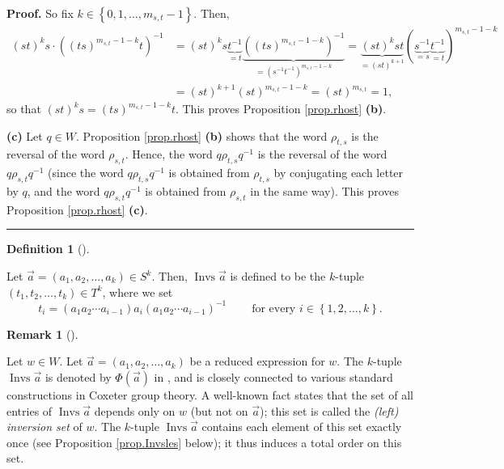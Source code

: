 \documentclass[numbers=enddot,12pt,final,onecolumn,notitlepage,abstracton]{scrartcl}%
\theoremstyle{definition}
\newtheorem{defi}[theo]{Definition}
\newenvironment{definition}[1][]
{\begin{defi}[#1]\begin{leftbar}}
{\end{leftbar}\end{defi}}
\newtheorem{remk}[theo]{Remark}
\newenvironment{remark}[1][]
{\begin{remk}[#1]\begin{leftbar}}
{\end{leftbar}\end{remk}}
\newenvironment{proof}[1][Proof]{\noindent\textbf{#1.} }{\ \rule{0.5em}{0.5em}}
\begin{document}
\begin{proof}
So fix $k\in\left\{  0,1,\ldots,m_{s,t}-1\right\}  $. Then,%
\begin{align*}
\left(  st\right)  ^{k}s\cdot\left(  \left(  ts\right)  ^{m_{s,t}%
-1-k}t\right)  ^{-1}  &  =\left(  st\right)  ^{k}s\underbrace{t^{-1}}%
_{=t}\underbrace{\left(  \left(  ts\right)  ^{m_{s,t}-1-k}\right)  ^{-1}%
}_{=\left(  s^{-1}t^{-1}\right)  ^{m_{s,t}-1-k}}=\underbrace{\left(
st\right)  ^{k}st}_{=\left(  st\right)  ^{k+1}}\left(  \underbrace{s^{-1}%
}_{=s}\underbrace{t^{-1}}_{=t}\right)  ^{m_{s,t}-1-k}\\
&  =\left(  st\right)  ^{k+1}\left(  st\right)  ^{m_{s,t}-1-k}=\left(
st\right)  ^{m_{s,t}}=1,
\end{align*}
so that $\left(  st\right)  ^{k}s=\left(  ts\right)  ^{m_{s,t}-1-k}t$. This
proves Proposition \ref{prop.rhost} \textbf{(b)}. \medskip

\textbf{(c)} Let $q\in W$. Proposition \ref{prop.rhost} \textbf{(b)} shows
that the word $\rho_{t,s}$ is the reversal of the word $\rho_{s,t}$. Hence,
the word $q\rho_{t,s}q^{-1}$ is the reversal of the word $q\rho_{s,t}q^{-1}$
(since the word $q\rho_{t,s}q^{-1}$ is obtained from $\rho_{t,s}$ by
conjugating each letter by $q$, and the word $q\rho_{s,t}q^{-1}$ is obtained
from $\rho_{s,t}$ in the same way). This proves Proposition \ref{prop.rhost}
\textbf{(c)}.
\end{proof}

\begin{definition}
\label{def.Invsle}Let $\overrightarrow{a}=\left(  a_{1},a_{2},\ldots
,a_{k}\right)  \in S^{k}$. Then, $\operatorname*{Invs}\overrightarrow{a}$ is
defined to be the $k$-tuple $\left(  t_{1},t_{2},\ldots,t_{k}\right)  \in
T^{k}$, where we set%
\[
t_{i}=\left(  a_{1}a_{2}\cdots a_{i-1}\right)  a_{i}\left(  a_{1}a_{2}\cdots
a_{i-1}\right)  ^{-1}\ \ \ \ \ \ \ \ \ \ \text{for every }i\in\left\{
1,2,\ldots,k\right\}  .
\]

\end{definition}

\begin{remark}
Let $w\in W$. Let $\overrightarrow{a}=\left(  a_{1},a_{2},\ldots,a_{k}\right)
$ be a reduced expression for $w$. The $k$-tuple $\operatorname*{Invs}%
\overrightarrow{a}$ is denoted by $\Phi\left(  \overrightarrow{a}\right)  $ in
\cite[Chapter 4, n$^{\circ}$ 1.4]{Bourbaki4-6}, and is closely connected to
various standard constructions in Coxeter group theory. A well-known fact
states that the set of all entries of $\operatorname*{Invs}\overrightarrow{a}$
depends only on $w$ (but not on $\overrightarrow{a}$); this set is called the
\emph{(left) inversion set} of $w$. The $k$-tuple $\operatorname*{Invs}%
\overrightarrow{a}$ contains each element of this set exactly once (see
Proposition \ref{prop.Invsles} below); it thus induces a total order on this set.
\end{remark}
\end{document}
